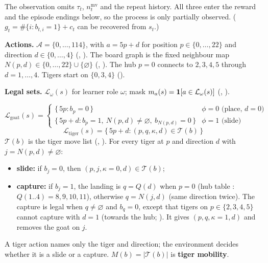 The observation omits $\tau_t$, $n^{\text{mv}}_t$ and the repeat history. All three enter the reward and the episode endings below, so the process is only partially observed. ($g_t = \#\{i : b_{t,i}=1\} + c_t$ can be recovered from $s_t$.)

\textbf{Actions.} $\mathcal{A} = \{0,\dots,114\}$, with $a = 5p + d$ for position $p \in \{0,\dots,22\}$ and direction $d \in \{0,\dots,4\}$ (, ). The board graph is the fixed neighbour map $N(p, d) \in \{0,\dots,22\} \cup \{\varnothing\}$ (, ). The hub $p = 0$ connects to $2, 3, 4, 5$ through $d = 1,\dots,4$. Tigers start on $\{0, 3, 4\}$ ().

\textbf{Legal sets.} $\mathcal{L}_\omega(s)$ for learner role $\omega$; mask $m_a(s) = \mathbf{1}[a \in \mathcal{L}_\omega(s)]$ (, ).

\[
\mathcal{L}_{\text{goat}}(s) = \begin{cases}
\{\,5p : b_p = 0\,\} & \phi = 0 \text{ (place, } d = 0) \\
\{\,5p + d : b_p = 1,\ N(p,d) \neq \varnothing,\ b_{N(p,d)} = 0\,\} & \phi = 1 \text{ (slide)}
\end{cases}
\]
\[
\mathcal{L}_{\text{tiger}}(s) = \{\,5p + d : (p, q, \kappa, d) \in \mathcal{T}(b)\,\}
\]
$\mathcal{T}(b)$ is the tiger move list (, ). For every tiger at $p$ and direction $d$ with $j = N(p,d) \neq \varnothing$:

\begin{itemize}
\item \textbf{slide:} if $b_j = 0$, then $(p, j, \kappa{=}0, d) \in \mathcal{T}(b)$;
\item \textbf{capture:} if $b_j = 1$, the landing is $q = Q(d)$ when $p = 0$ (hub table : $Q(1..4) = 8, 9, 10, 11$), otherwise $q = N(j, d)$ (same direction twice). The capture is legal when $q \neq \varnothing$ and $b_q = 0$, except that tigers on $p \in \{2,3,4,5\}$ cannot capture with $d = 1$ (towards the hub; ). It gives $(p, q, \kappa{=}1, d)$ and removes the goat on $j$.
\end{itemize}
A tiger action names only the tiger and direction; the environment decides whether it is a slide or a capture. $M(b) = |\mathcal{T}(b)|$ is \textbf{tiger mobility}.

